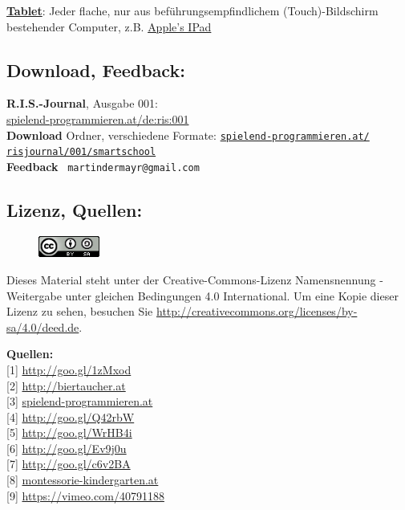 \href{https://de.wikipedia.org/wiki/Tablet-Computer}{\textbf{Tablet}}: Jeder flache, nur aus beführungsempfindlichem (Touch)-Bildschirm bestehender Computer, z.B. \href{https://de.wikipedia.org/wiki/Apple_iPad}{Apple's IPad}


\subsection*{Download, Feedback:}
\textbf{R.I.S.-Journal}, Ausgabe 001: \\
\href{http://spielend-programmieren.at/de:ris:001}{spielend-programmieren.at/de:ris:001}\\
\textbf{Download} Ordner, verschiedene Formate: \href{http://spielend-programmieren.at/risjournal/001/smartschool}{\texttt{spielend-programmieren.at/\\risjournal/001/smartschool}} \\
\textbf{Feedback} \Letter\ \texttt{martindermayr@gmail.com} \\

\subsection*{Lizenz, Quellen:}
\begin{figure}
\includegraphics[width=2cm]{smartschool/ccbysa88x31.png}
\end{figure}
Dieses Material steht unter der Creative-Commons-Lizenz Namensnennung - Weitergabe unter gleichen Bedingungen 4.0 International. Um eine Kopie dieser Lizenz zu sehen, besuchen Sie \url{http://creativecommons.org/licenses/by-sa/4.0/deed.de}.

\textbf{Quellen:} \\
{[}1{]} \url{http://goo.gl/1zMxod} \\
{[}2{]} \url{http://biertaucher.at} \\
{[}3{]} \href{http://spielend-programmieren.at}{spielend-programmieren.at} \\
{[}4{]} \url{http://goo.gl/Q42rbW} \\
{[}5{]} \url{http://goo.gl/WrHB4i} \\
{[}6{]} \url{http://goo.gl/Ev9j0u} \\
{[}7{]} \url{http://goo.gl/c6v2BA} \\
{[}8{]} \href{http://www.montessori-kindergarten.at/}{montessorie-kindergarten.at} \\
{[}9{]} \url{https://vimeo.com/40791188} 



